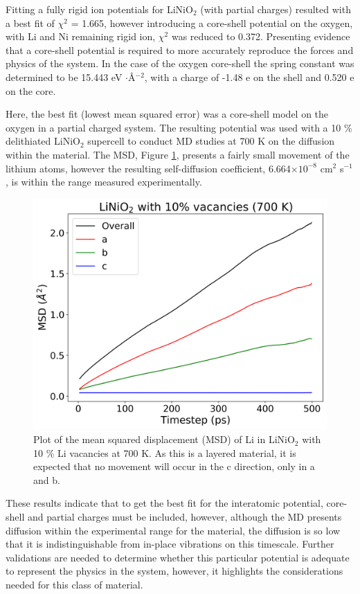 \documentclass[journal=jacsat,manuscript=article]{achemso}
\begin{document}
Fitting a fully rigid ion potentials for LiNiO$_2$ (with partial charges) resulted with a best fit of $\chi^2$ = 1.665, however introducing a core-shell potential on the oxygen, with Li and Ni remaining rigid ion, $\chi^2$ was reduced to 0.372. Presenting evidence that a core-shell potential is required to more accurately reproduce the forces and physics of the system. In the case of the oxygen core-shell the spring constant was determined to be 15.443 eV $\cdot$\AA$^{-2}$, with a charge of -1.48 e on the shell and 0.520 e on the core.

Here, the best fit (lowest mean squared error) was a core-shell model on the oxygen in a partial charged system. The resulting potential was used with a 10 \% delithiated LiNiO$_2$ supercell to conduct MD studies at 700 K on the diffusion within the material. The MSD, Figure \ref{fig:MSD_LiNiO2}, presents a fairly small movement of the lithium atoms, however the resulting self-diffusion coefficient, 6.664$\times 10^{-8}$  cm$^{2}$ s$^{-1}$, is within the range measured experimentally. \cite{Nakamura2000,bruce1992vacancy}

\begin{figure}
    \centering
    \includegraphics[scale=0.45]{Figures/MSD_LiNiO2.png}
    \caption{\label{fig:MSD_LiNiO2} Plot of the mean squared displacement (MSD) of Li in LiNiO$_2$ with 10 \% Li vacancies at 700 K. As this is a layered material, it is expected that no movement will occur in the c direction, only in a and b.}
\end{figure}

These results indicate that to get the best fit for the interatomic potential, core-shell and partial charges must be included, however, although the MD presents diffusion within the experimental range for the material, \cite{Nakamura2000,bruce1992vacancy} the diffusion is so low that it is indistinguishable from in-place vibrations on this timescale. Further validations are needed to determine whether this particular potential is adequate to represent the physics in the system, however, it highlights the considerations needed for this class of material.
\end{document}

